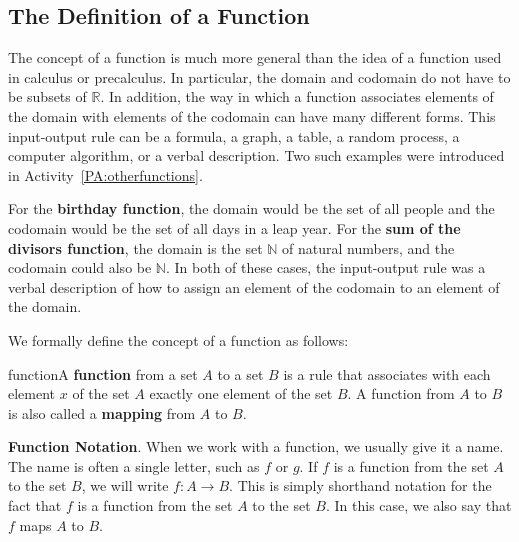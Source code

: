 \subsection*{The Definition of a Function}
The concept of a function is much more general than the idea of a function used in calculus or precalculus.  In particular, the domain and codomain do not have to be subsets of  $\mathbb{R}$.  In addition, the way in which a function associates elements of the domain with elements of the codomain can have many different forms.  This input-output rule can be a formula, a graph, a table, a random process, a computer algorithm, or a verbal description.  Two such examples were introduced in \typeu Activity~\ref*{PA:otherfunctions}.

For the \textbf{birthday function}, 
%
 the domain would be the set of all people and the codomain would be the set of all days in a leap year.  For the \textbf{sum of the divisors function},
%
 the domain is the set  $\mathbb{N}$ of natural numbers, and the codomain could also be  $\mathbb{N}$.  In both of these cases, the input-output rule was a verbal description of how to assign an element of the codomain to an element of the domain.

We formally define the concept of a function as follows:
%
\begin{defbox}{function}{A \textbf{function}
%
 from a set  $A$  to a set  $B$  is a rule that associates with each element  $x$  of the set  $A$  exactly one element of the set  $B$.  A function from  $A$  to  $B$ is also called a 
\textbf{mapping}
%
 from  $A$  to  $B$.}
\end{defbox}
%
\noindent
\textbf{Function Notation}.  When we work with a function, we usually give it a name.  The name is often a single letter, such as  $f$  or  $g$.  If  $f$  is a function from the set  $A$  to the set  $B$, we will write  $f \colon A \to B$.
\label{sym:function}%
  This is simply shorthand notation for the fact that  $f$  is a function from the set  $A$  to the set  $B$.  In this case, we also say that  $f$  maps  $A$  to  $B$.

